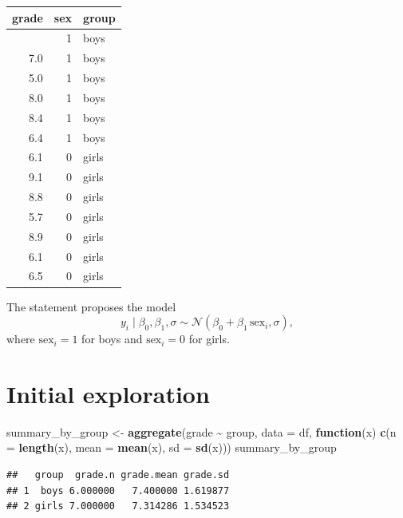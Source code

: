 \documentclass[
  english,
  12pt,
]{article}
\newenvironment{Shaded}{\begin{snugshade}}{\end{snugshade}}
\newcommand{\AttributeTok}[1]{\textcolor[rgb]{0.13,0.29,0.53}{#1}}
\newcommand{\ControlFlowTok}[1]{\textcolor[rgb]{0.13,0.29,0.53}{\textbf{#1}}}
\newcommand{\FunctionTok}[1]{\textcolor[rgb]{0.13,0.29,0.53}{\textbf{#1}}}
\newcommand{\NormalTok}[1]{#1}
\newcommand{\OtherTok}[1]{\textcolor[rgb]{0.56,0.35,0.01}{#1}}
\newcommand{\SpecialCharTok}[1]{\textcolor[rgb]{0.81,0.36,0.00}{\textbf{#1}}}
\begin{document}
\begin{longtable}[]{@{}rrl@{}}
\toprule\noalign{}
grade & sex & group \\
\midrule\noalign{}
\endhead
\bottomrule\noalign{}
\endlastfoot
9.6 & 1 & boys \\
7.0 & 1 & boys \\
5.0 & 1 & boys \\
8.0 & 1 & boys \\
8.4 & 1 & boys \\
6.4 & 1 & boys \\
6.1 & 0 & girls \\
9.1 & 0 & girls \\
8.8 & 0 & girls \\
5.7 & 0 & girls \\
8.9 & 0 & girls \\
6.1 & 0 & girls \\
6.5 & 0 & girls \\
\end{longtable}

The statement proposes the model \[
y_i \mid \beta_0, \beta_1, \sigma \sim \mathcal N(\beta_0 + \beta_1\, \text{sex}_i, \sigma),
\] where \(\text{sex}_i = 1\) for boys and \(\text{sex}_i = 0\) for
girls.

\section{Initial exploration}\label{initial-exploration}

\begin{Shaded}
\begin{Highlighting}[]
\NormalTok{summary\_by\_group }\OtherTok{\textless{}{-}} \FunctionTok{aggregate}\NormalTok{(grade }\SpecialCharTok{\textasciitilde{}}\NormalTok{ group, }\AttributeTok{data =}\NormalTok{ df, }\ControlFlowTok{function}\NormalTok{(x) }\FunctionTok{c}\NormalTok{(}\AttributeTok{n =} \FunctionTok{length}\NormalTok{(x), }\AttributeTok{mean =} \FunctionTok{mean}\NormalTok{(x), }\AttributeTok{sd =} \FunctionTok{sd}\NormalTok{(x)))}
\NormalTok{summary\_by\_group}
\end{Highlighting}
\end{Shaded}

\begin{verbatim}
##   group  grade.n grade.mean grade.sd
## 1  boys 6.000000   7.400000 1.619877
## 2 girls 7.000000   7.314286 1.534523
\end{verbatim}
\end{document}
